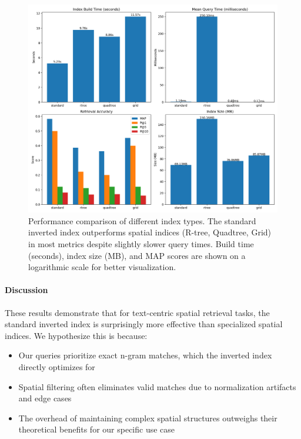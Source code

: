 \documentclass[manuscript,screen]{acmart}
\begin{document}
\begin{figure}[t]
    \centering
    \includegraphics[width=\linewidth]{../output/benchmark/benchmark_results.png}
    \caption{Performance comparison of different index types. The standard inverted index outperforms spatial indices (R-tree, Quadtree, Grid) in most metrics despite slightly slower query times. Build time (seconds), index size (MB), and MAP scores are shown on a logarithmic scale for better visualization.}
    \label{fig:index_comparison}
\end{figure}

\paragraph{Discussion} These results demonstrate that for text-centric spatial retrieval tasks, the standard inverted index is surprisingly more effective than specialized spatial indices. We hypothesize this is because:
\begin{itemize}
    \item Our queries prioritize exact n-gram matches, which the inverted index directly optimizes for
    \item Spatial filtering often eliminates valid matches due to normalization artifacts and edge cases
    \item The overhead of maintaining complex spatial structures outweighs their theoretical benefits for our specific use case
\end{itemize}
\end{document}

